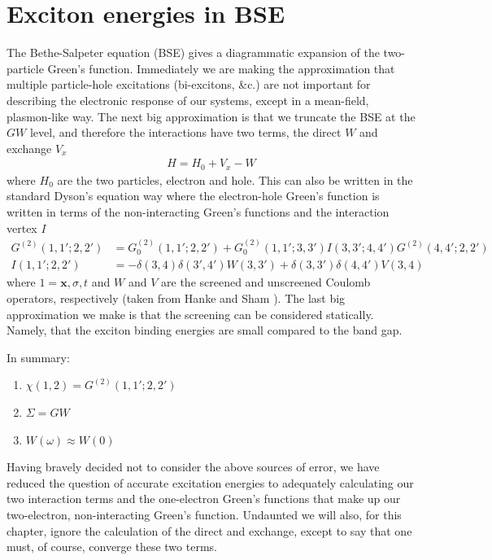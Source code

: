 \documentclass[11pt]{report}
\begin{document}
\section{Exciton energies in BSE}
\label{CLS.bse}
The Bethe-Salpeter equation (BSE) gives a diagrammatic expansion of the two-particle Green's function. 
Immediately we are making the approximation that multiple particle-hole excitations (bi-excitons, \&c.) are not important for describing the electronic response of our systems, except in a mean-field, plasmon-like way. 
The next big approximation is that we truncate the BSE at the $GW$ level, and therefore the interactions have two terms, the direct $W$ and exchange $V_x$
\begin{align}
H = H_0 + V_x - W
\end{align}
where $H_0$ are the two particles, electron and hole. 
This can also be written in the standard Dyson's equation way where the electron-hole Green's function is written in terms of the non-interacting Green's functions and the interaction vertex $I$
\begin{align}
G^{(2)}(1,1';2,2') &= G_0^{(2)}(1,1';2,2')  + G_0^{(2)}(1,1';3,3') I(3,3';4,4') G^{(2)}(4,4';2,2') \label{2e-gf} \\
I(1,1';2,2') &= -\delta(3,4) \delta(3',4') W(3,3') + \delta(3,3') \delta(4,4') V(3,4)
\end{align}
where $1=\mathbf{x},\sigma,t$ and $W$ and $V$ are the screened and unscreened Coulomb operators, respectively (taken from Hanke and Sham \cite{PhysRevB.21.4656}). 
The last big approximation we make is that the screening can be considered statically.
Namely, that the exciton binding energies are small compared to the band gap. 

In summary:
\begin{enumerate}
\item{ $\chi(1,2) = G^{(2)}(1,1';2,2')$ }
\item{ $\Sigma = GW$ }
\item{ $W(\omega) \approx W(0)$ }
\end{enumerate}
Having bravely decided not to consider the above sources of error, we have reduced the question of accurate excitation energies to adequately calculating our two interaction terms and the one-electron Green's functions that make up our two-electron, non-interacting Green's function.
Undaunted we will also, for this chapter, ignore the calculation of the direct and exchange, except to say that one must, of course, converge these two terms.
\end{document}
